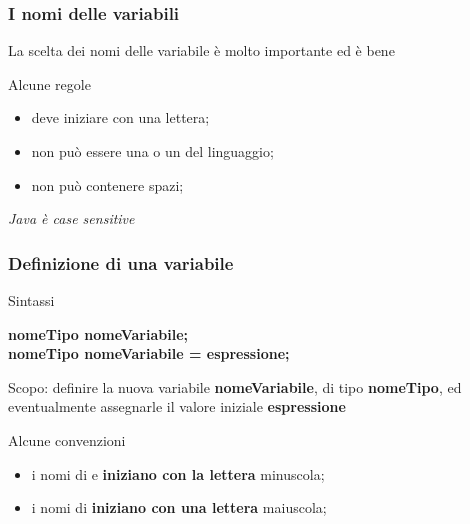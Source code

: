 \subsubsection*{I nomi delle variabili}
\begin{frame}
\begin{block}{}
La scelta dei nomi delle variabile è molto importante ed è bene 
\end{block}
\begin{block}{Alcune regole}
\begin{itemize}
\item deve iniziare con una lettera;
\item non può essere una  o un  del linguaggio;
\item non può contenere spazi;
\end{itemize}
\end{block}
\pause
\begin{block}{}
\begin{center}
\textit{Java è case sensitive}
\end{center}
\end{block}
\end{frame}

\begin{frame}
\frametitle{Definizione di una variabile}
\begin{block}{Sintassi}
\begin{center}
\textbf{nomeTipo nomeVariabile;}\\
\textbf{nomeTipo nomeVariabile = espressione;}
\end{center}
\end{block}
\begin{block}{}
Scopo: definire la nuova variabile \textbf{nomeVariabile}, di tipo \textbf{nomeTipo}, ed eventualmente assegnarle il valore
iniziale \textbf{espressione}
\end{block}
\begin{block}{Alcune convenzioni}
\begin{itemize}
\item i nomi di  e  \textbf{iniziano con la lettera} \alert{minuscola};
\item i nomi di  \textbf{iniziano con una lettera} \alert{maiuscola};
\end{itemize}
\end{block}
\end{frame}


